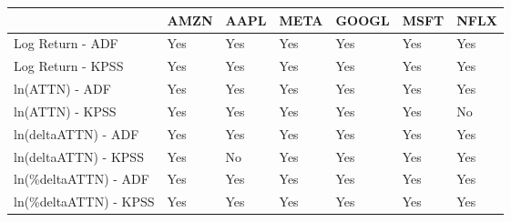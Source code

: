 \begin{tabular}{lllllll}
\toprule
{} & AMZN & AAPL & META & GOOGL & MSFT & NFLX \\
\midrule
Log Return - ADF      &  Yes &  Yes &  Yes &   Yes &  Yes &  Yes \\
Log Return - KPSS     &  Yes &  Yes &  Yes &   Yes &  Yes &  Yes \\
ln(ATTN) - ADF        &  Yes &  Yes &  Yes &   Yes &  Yes &  Yes \\
ln(ATTN) - KPSS       &  Yes &  Yes &  Yes &   Yes &  Yes &   No \\
ln(deltaATTN) - ADF   &  Yes &  Yes &  Yes &   Yes &  Yes &  Yes \\
ln(deltaATTN) - KPSS  &  Yes &   No &  Yes &   Yes &  Yes &  Yes \\
ln(\%deltaATTN) - ADF  &  Yes &  Yes &  Yes &   Yes &  Yes &  Yes \\
ln(\%deltaATTN) - KPSS &  Yes &  Yes &  Yes &   Yes &  Yes &  Yes \\
\bottomrule
\end{tabular}

